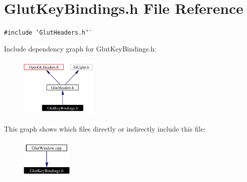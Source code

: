 \section{Glut\-Key\-Bindings.h File Reference}
\label{GlutKeyBindings_8h}
{\tt \#include \char`\"{}Glut\-Headers.h\char`\"{}}\par


Include dependency graph for Glut\-Key\-Bindings.h:\begin{figure}[H]
\begin{center}
\leavevmode
\includegraphics[width=105pt]{GlutKeyBindings_8h__incl}
\end{center}
\end{figure}


This graph shows which files directly or indirectly include this file:\begin{figure}[H]
\begin{center}
\leavevmode
\includegraphics[width=70pt]{GlutKeyBindings_8h__dep__incl}
\end{center}
\end{figure}
